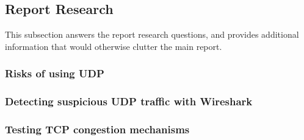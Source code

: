\subsection{Report Research}

This subsection answers the report research questions, and provides additional
information that would otherwise clutter the main report.

\subsubsection{Risks of using UDP}

\subsubsection{Detecting suspicious UDP traffic with Wireshark}

\subsubsection{Testing TCP congestion mechanisms}
